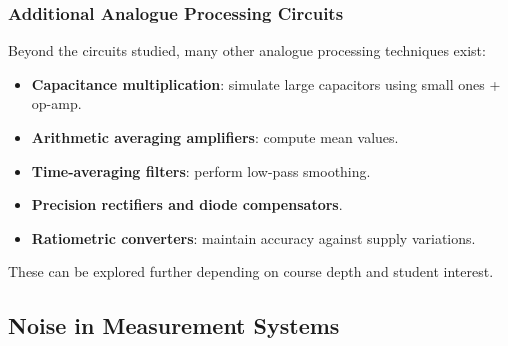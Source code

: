 \begin{frame}
	\frametitle{Additional Analogue Processing Circuits}
	Beyond the circuits studied, many other analogue processing techniques exist:
	\begin{itemize}
		\item \textbf{Capacitance multiplication}: simulate large capacitors using small ones + op-amp.
		\item \textbf{Arithmetic averaging amplifiers}: compute mean values.
		\item \textbf{Time-averaging filters}: perform low-pass smoothing.
		\item \textbf{Precision rectifiers and diode compensators}.
		\item \textbf{Ratiometric converters}: maintain accuracy against supply variations.
	\end{itemize}
	These can be explored further depending on course depth and student interest.
\end{frame}

\subsection{Noise in Measurement Systems}

